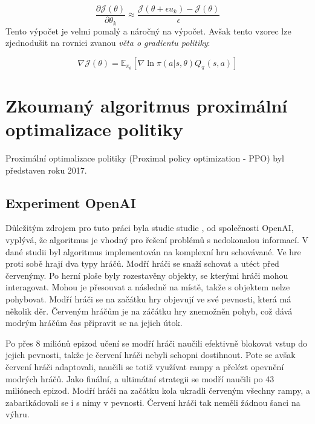 \begin{equation}
  \label{eq:gradient_politiky}
  \frac{\partial \mathcal{J}(\theta)}{\partial \theta_k} \approx \frac{\mathcal{J}(\theta + \epsilon u_k) - \mathcal{J}(\theta)}{\epsilon}
\end{equation}
Tento výpočet je velmi pomalý a náročný na výpočet.
Avšak tento vzorec lze zjednodušit na rovnici zvanou \emph{věta o gradientu politiky}:

\begin{equation}
    \label{eq:veta_o_gradientu_politiky}
  \nabla \mathcal{J}(\theta) = \mathbb{E}_{\pi_\theta} [\nabla \ln \pi(a \vert s, \theta) Q_\pi(s, a)]
\end{equation}


\section{Zkoumaný algoritmus proximální optimalizace politiky}
\label{sec:proximalni-optimalizace-politiky}

Proximální optimalizace politiky (Proximal policy optimization - PPO) byl představen roku 2017\cite{PPO_paper}.

\subsection{Experiment OpenAI}
Důležitým zdrojem pro tuto práci byla studie studie \cite{PPO_Hide_Seek_paper}, od společnosti OpenAI, vyplývá, že algoritmus je vhodný pro řešení problémů s nedokonalou informací.
V dané studii byl algoritmus implementován na komplexní hru schovávané.
Ve hre proti sobě hrají dva typy hráčů.
Modří hráči se snaží schovat a utéct před červenýmy.
Po herní ploše byly rozestavěny objekty, se kterými hráči mohou interagovat.
Mohou je přesouvat a následně  na místě, takže s objektem nelze pohybovat.
Modří hráči se na začátku hry objevují ve své pevnosti, která má několik děr.
Červeným hráčům je na záčátku hry znemožněn pohyb, což dává modrým hráčům čas připravit se na jejich útok.

Po přes 8 miliónů epizod učení se modří hráči naučili efektivně blokovat vstup do jejich pevnosti, takže je červení hráči nebyli schopni dostihnout.
Pote se avšak červení hráči adaptovali, naučili se totiž využívat rampy a přelézt opevnění modrých hráčů.
Jako finální, a ultimátní strategii se modří naučili po 43 miliónech epizod.
Modří hráči na začátku kola ukradli červeným všechny rampy, a zabarikádovali se i s nimy v pevnosti.
Červení hráči tak neměli žádnou šanci na výhru.

